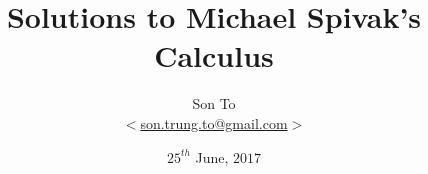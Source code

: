 \documentclass[a4paper,11pt]{memoir}
\newcommand{\note}[1]{\emph{#1}}
\theoremstyle{plain} \newtheorem{id}{Lemma}[chapter]
\theoremstyle{definition} \newtheorem{pr}{Problem}[chapter]
\theoremstyle{remark}\newtheorem{ab}{Remark}[chapter]
\begin{document}
  \title{Solutions to Michael Spivak's Calculus}
  \author{Son To\\
  $<$\href{mailto:son.trung.to@gmail.com}%
  {son.trung.to@gmail.com}$>$}
  \date{$25^{th}$ June, $2017$}

  \maketitle
  \makeatletter
  \def\cleardoublepage{\clearpage\if@twoside
  \ifodd\c@page\else
    \hbox{}
    \vspace*{\fill}
    \begin{center}
      \doublenote
    \end{center}
    \vspace*{\fill}
    \thispagestyle{empty}
    \newpage
    \if@twocolumn\hbox{}\newpage\fi\fi\fi
}
\newcommand{\mylabel}[2]{#2\def\@currentlabel{#2}\label{#1}}
\def\@endpart{\vfill\newpage
              \if@twoside
                \if@openright
                  \null
                  \thispagestyle{empty}%
\vspace*{\fill}%
\begin{quote}%
  \partnote
\end{quote}%
\vspace*{\fill}%
                  \newpage
                \fi
              \fi
              \if@tempswa
                \twocolumn
              \fi
}
\newcommand{\partnote}{}
\newcommand{\doublenote}{}

\newcommand\binomialCoefficient[2]{%
  \c@pgf@counta=#1 %
  \c@pgf@countb=#2 %
  \c@pgf@countc=\c@pgf@counta%
  \advance \c@pgf@countc by-\c@pgf@countb%
  \ifnum\c@pgf@countb>\c@pgf@countc%
    \c@pgf@countb=\c@pgf@countc%
  \fi%
  \c@pgf@countc=1 %
  \c@pgf@countd=0 %
  \pgfmathloop %
    \ifnum\c@pgf@countd<\c@pgf@countb%
    \multiply \c@pgf@countc by\c@pgf@counta%
    \advance  \c@pgf@counta by-1%
    \advance  \c@pgf@countd by1%
    \divide   \c@pgf@countc by\c@pgf@countd%
  \repeatpgfmathloop%
  \the\c@pgf@countc%
}
\makeatother

\renewcommand{\doublenote}{%
\note{On maailmalle}}
\frontmatter
\end{document}

